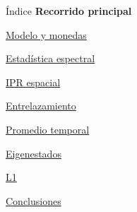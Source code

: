 \documentclass[aspectratio=169,10pt]{beamer}
\newif\ifapendice
\begin{document}
\newcommand{\MainIndexLinks}{%
  \hyperlink{sec-modelo}{\textcolor{acento}{Modelo y monedas}}\par\vspace{2.5mm}
  \hyperlink{sec-estadistica}{\textcolor{acento}{Estadística espectral}}\par\vspace{2.5mm}
  \hyperlink{sec-ipr}{\textcolor{acento}{IPR espacial}}\par\vspace{2.5mm}
  \hyperlink{sec-entrelazamiento}{\textcolor{acento}{Entrelazamiento}}\par\vspace{2.5mm}
  \hyperlink{sec-temporal}{\textcolor{acento}{Promedio temporal}}\par\vspace{2.5mm}
  \hyperlink{sec-eigenestados}{\textcolor{acento}{Eigenestados}}\par\vspace{2.5mm}
  \hyperlink{sec-l1}{\textcolor{acento}{L1}}\par\vspace{2.5mm}
  \hyperlink{sec-conclusiones}{\textcolor{acento}{Conclusiones}}\par}
\ifapendice
  \def\IndiceContenido{%
    \begin{columns}[T,onlytextwidth]
      \begin{column}{.56\textwidth}
        \textbf{Recorrido principal}\par\smallskip
        {\small\MainIndexLinks}
      \end{column}
      \begin{column}{.40\textwidth}
        \textbf{Apéndice}\par\smallskip
        \hyperlink{ap-espectral}{\textcolor{acento}{Estadística espectral}}\par\medskip
        \hyperlink{ap-temporal}{\textcolor{acento}{Promedio temporal}}\par\medskip
        \hyperlink{ap-eigenestados}{\textcolor{acento}{Eigenestados}}\par\medskip
        \hyperlink{ap-l1}{\textcolor{acento}{L1: intervalos intermedios}}\par\medskip
        \hyperlink{ap-monedas}{\textcolor{acento}{Matrices de monedas}}
      \end{column}
    \end{columns}}
\else
  \def\IndiceContenido{%
    \textbf{Recorrido principal}\par\smallskip
    {\small\MainIndexLinks}}
\fi
\begin{frame}[t,label=indice]{Índice}
  \IndiceContenido
\end{frame}
\end{document}
